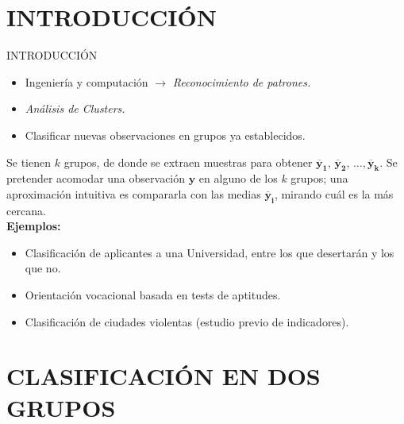 
\section{INTRODUCCIÓN}
\begin{frame}{INTRODUCCIÓN}
    \begin{itemize}
        \item Ingeniería y computación $\rightarrow$ \textit{Reconocimiento de patrones.}
        \item \textit{Análisis de Clusters.}
        \item Clasificar nuevas observaciones en grupos ya establecidos.
    \end{itemize}
    Se tienen $k$ grupos, de donde se extraen muestras para obtener $\mathbf{\overbar{y}_1,\,\overbar{y}_2,\,\dots,\overbar{y}_k}$. Se pretender acomodar una observación $\mathbf{y}$ en alguno de los $k$ grupos; una aproximación intuitiva es compararla con las medias $\mathbf{\overbar{y}_i}$, mirando cuál es la más cercana.
    \\\vspace{5mm}
    \textbf{Ejemplos:}
    \begin{itemize}
        \item Clasificación de aplicantes a una Universidad, entre los que desertarán y los que no.
        \item Orientación vocacional basada en tests de aptitudes.
        \item Clasificación de ciudades violentas (estudio previo de indicadores).
    \end{itemize}
\end{frame}

\section{CLASIFICACIÓN EN DOS GRUPOS}
